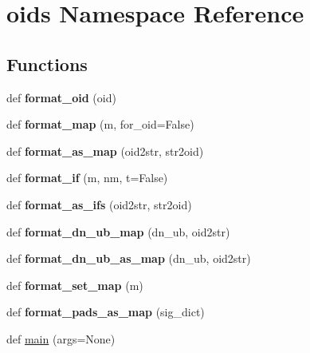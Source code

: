 \hypertarget{namespaceoids}{}\section{oids Namespace Reference}
\label{namespaceoids}
\subsection*{Functions}
\begin{DoxyCompactItemize}
\item 
\mbox{\label{namespaceoids_a04b3fa2a9730d18f62297b83e9a8ef4b}} 
def {\bfseries format\+\_\+oid} (oid)
\item 
\mbox{\label{namespaceoids_a30405d5983d0625b6f46e2ea7179e384}} 
def {\bfseries format\+\_\+map} (m, for\+\_\+oid=False)
\item 
\mbox{\label{namespaceoids_a43991bcc8d01a421a942dbdaca5c29be}} 
def {\bfseries format\+\_\+as\+\_\+map} (oid2str, str2oid)
\item 
\mbox{\label{namespaceoids_adb87c821455f07f60575165dc7aa7c85}} 
def {\bfseries format\+\_\+if} (m, nm, t=False)
\item 
\mbox{\label{namespaceoids_ae15386c4f4090aded4db3d0f67616850}} 
def {\bfseries format\+\_\+as\+\_\+ifs} (oid2str, str2oid)
\item 
\mbox{\label{namespaceoids_aa5fb24748ea18e157039757efe69acb2}} 
def {\bfseries format\+\_\+dn\+\_\+ub\+\_\+map} (dn\+\_\+ub, oid2str)
\item 
\mbox{\label{namespaceoids_a77d6605945c5815428be235244766827}} 
def {\bfseries format\+\_\+dn\+\_\+ub\+\_\+as\+\_\+map} (dn\+\_\+ub, oid2str)
\item 
\mbox{\label{namespaceoids_afd9a85cf96902b7c816c4efed2dde37b}} 
def {\bfseries format\+\_\+set\+\_\+map} (m)
\item 
\mbox{\label{namespaceoids_a1c29fbd4ec9fee7aa60105dd6a1d3359}} 
def {\bfseries format\+\_\+pads\+\_\+as\+\_\+map} (sig\+\_\+dict)
\item 
def \mbox{\hyperlink{namespaceoids_a7f49458c3a17f1edcc9d5fcf9b23c048}{main}} (args=None)
\end{DoxyCompactItemize}


